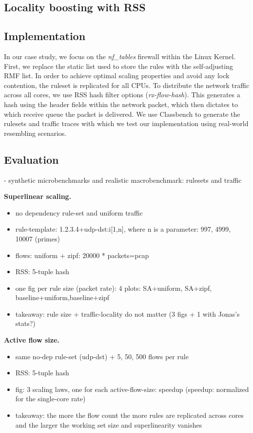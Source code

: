 \subsection{Locality boosting with RSS}
\label{sec:sa-rss}




\subsection{Implementation}
\label{sec:sa-nf-tables-impl}
In our case study, we focus on the \textit{nf\_tables} firewall within the Linux Kernel. First, we replace the static list used to store the rules with the self-adjusting RMF list. 
In order to achieve optimal scaling properties and avoid any lock contention, the ruleset is replicated for all CPUs. To distribute the network traffic across all cores, we use RSS hash filter options (\textit{rx-flow-hash}).
This generates a hash using the header fields within the network packet, which then dictates to which receive queue the packet is delivered.
We use Classbench \cite{4237157} to generate the rulesets and traffic traces with which we test our implementation using real-world resembling scenarios. 


\subsection{Evaluation}
\label{sec:sa-nf-tables-eval}

- synthetic microbenchmarks and realistic macrobenchmark: rulesets and traffic

\noindent%
\textbf{Superlinear scaling.} %
\begin{itemize}
\item no dependency rule-set and uniform traffic
\item rule-template: 1.2.3.4+udp-dst:i[1,n], where n is a parameter: 997, 4999, 10007 (primes)
\item flows: uniform + zipf: 20000 * packets=pcap
\item RSS: 5-tuple hash
\item one fig per rule size (packet rate): 4 plots: SA+uniform, SA+zipf, baseline+uniform,baseline+zipf
\item takeaway: rule size + traffic-locality do not matter (3 figs + 1 with Jonas's stats?)
\end{itemize}

\noindent%
\textbf{Active flow size.} %
\begin{itemize}
\item same no-dep rule-set (udp-dst) + 5, 50, 500 flows per rule
\item RSS: 5-tuple hash
\item fig: 3 scaling laws, one for each active-flow-size: speedup (speedup: normalized for the single-core rate)
\item takeaway: the more the flow count the more rules are replicated across cores and the larger the working set size and superlinearity vanishes
\end{itemize}


